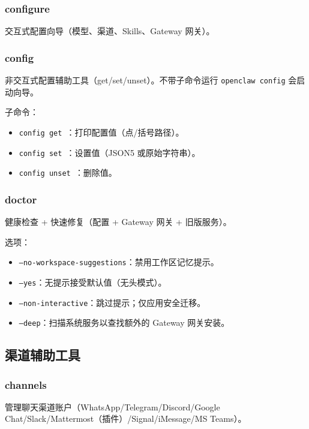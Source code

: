 \subsubsection{configure}


交互式配置向导（模型、渠道、Skills、Gateway 网关）。

\subsubsection{config}


非交互式配置辅助工具（get/set/unset）。不带子命令运行 \texttt{openclaw config} 会启动向导。

子命令：

\begin{itemize}
  \item \texttt{config get }：打印配置值（点/括号路径）。
  \item \texttt{config set  }：设置值（JSON5 或原始字符串）。
  \item \texttt{config unset }：删除值。
\end{itemize}


\subsubsection{doctor}


健康检查 + 快速修复（配置 + Gateway 网关 + 旧版服务）。

选项：

\begin{itemize}
  \item \texttt{--no-workspace-suggestions}：禁用工作区记忆提示。
  \item \texttt{--yes}：无提示接受默认值（无头模式）。
  \item \texttt{--non-interactive}：跳过提示；仅应用安全迁移。
  \item \texttt{--deep}：扫描系统服务以查找额外的 Gateway 网关安装。
\end{itemize}


\subsection{渠道辅助工具}


\subsubsection{channels}


管理聊天渠道账户（WhatsApp/Telegram/Discord/Google Chat/Slack/Mattermost（插件）/Signal/iMessage/MS Teams）。

